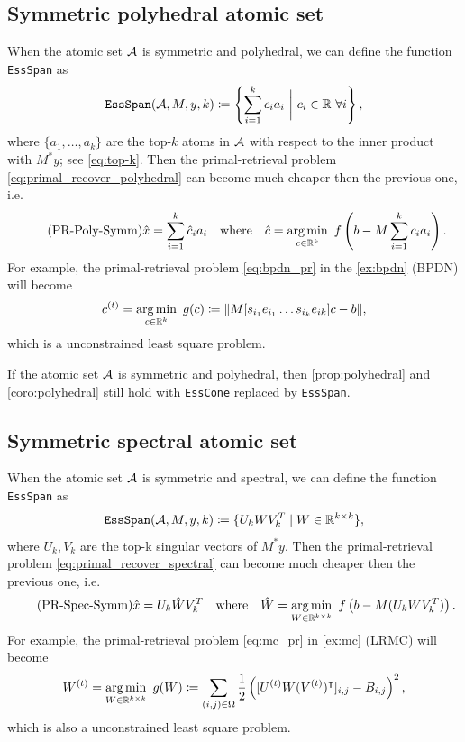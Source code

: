 \subsection{Symmetric polyhedral atomic set}
When the atomic set $\mathcal{A}$ is symmetric and polyhedral, we can define the function \texttt{EssSpan} as 
\[\texttt{EssSpan}(\mathcal{A}, M, y, k) \coloneqq \left\{\sum_{i=1}^k c_i a_i ~\bigg\vert~ c_i \in \mathbb{R} ~\forall i\right\},\]
where $\{a_1, \dots, a_k\}$ are the top-$k$ atoms in $\mathcal{A}$ with respect to the inner product with $M^*y$; see \autoref{eq:top-k}. Then the primal-retrieval problem \eqref{eq:primal_recover_polyhedral} can become much cheaper then the previous one, i.e.
\begin{equation} \label{eq:primal_recover_polyhedral2} \tag{PR-Poly-Symm}
\hat x = \sum_{i=1}^k \hat c_ia_i \hbox{\quad where\quad} \hat c = \underset{c \in \mathbb{R}^k}{\textrm{arg}\,{\min}}\enskip f\left( b - M\sum_{i=1}^k c_ia_i \right). 
\end{equation}
For example, the primal-retrieval problem \eqref{eq:bpdn_pr} in the \autoref{ex:bpdn} (BPDN) will become 
\begin{equation} \label{eq:bpdn_pr2}
    c^{(t)} = \underset{c \in \mathbb{R}^k}{\textrm{arg}\,{\min}}\enskip g(c) \coloneqq \|M[s_{i_1}e_{i_1} \dots s_{i_k}e_{ik}]c - b\|,
\end{equation}
which is a unconstrained least square problem. 

\begin{corollary}
    If the atomic set $\mathcal{A}$ is symmetric and polyhedral, then \autoref{prop:polyhedral} and \autoref{coro:polyhedral} still hold with \texttt{EssCone} replaced by \texttt{EssSpan}. 
\end{corollary}

\subsection{Symmetric spectral atomic set}
When the atomic set $\mathcal{A}$ is symmetric and spectral, we can define the function \texttt{EssSpan} as 
\[
    \texttt{EssSpan}(\mathcal{A}, M, y, k) \coloneqq \{U_kWV_k^T \mid W \in \mathbb{R}^{k\times k}\},
\]
where $U_k, V_k$ are the top-k singular vectors of $M^*y$. Then the primal-retrieval problem \eqref{eq:primal_recover_spectral} can become much cheaper then the previous one, i.e.
\begin{equation} \label{eq:primal_recover_spectral2} \tag{PR-Spec-Symm}
\hat x = U_k\hat W V_k^T \hbox{\quad where\quad} \hat W = \underset{W \in \mathbb{R}^{k\times k}}{\textrm{arg}\,{\min}}\enskip f\left( b - M(U_k W V_k^T) \right).
\end{equation}
For example, the primal-retrieval problem \eqref{eq:mc_pr} in \autoref{ex:mc} (LRMC) will become 
\begin{equation} \label{eq:mc_pr2}
    W^{(t)} = \underset{W \in \mathbb{R}^{k\times k}}{\textrm{arg}\,{\min}}\enskip g(W) \coloneqq \sum_{(i,j) \in \Omega}  \frac{1}{2}\left([U^{(t)}W(V^{(t)})^\intercal]_{i,j} - B_{i,j}\right)^2,
\end{equation}
which is also a unconstrained least square problem. 

